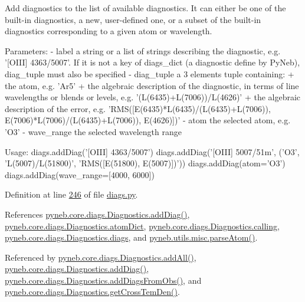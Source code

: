 \begin{DoxyVerb}Add diagnostics to the list of available diagnostics. It can either be one of the built-in diagnostics,
a new, user-defined one, or a subset of the built-in diagnostics corresponding to a given atom or wavelength.

Parameters:
    - label        a string or a list of strings describing the diagnostic, e.g. '[OIII] 4363/5007'. 
           If it is not a key of diags_dict (a diagnostic define by PyNeb), diag_tuple must also be specified
    - diag_tuple   a 3 elements tuple containing:
           + the atom, e.g. 'Ar5'
           + the algebraic description of the diagnostic, in terms of line wavelengths or blends or levels, 
             e.g. '(L(6435)+L(7006))/L(4626)'
           + the algebraic description of the error, e.g. 
             'RMS([E(6435)*L(6435)/(L(6435)+L(7006)), E(7006)*L(7006)/(L(6435)+L(7006)), E(4626)])'
    - atom         the selected atom, e.g. 'O3'
    - wave_range   the selected wavelength range
    
Usage:
diags.addDiag('[OIII] 4363/5007')
diags.addDiag('[OIII] 5007/51m', ('O3', 'L(5007)/L(51800)', 'RMS([E(51800), E(5007)])'))
diags.addDiag(atom='O3')
diags.addDiag(wave_range=[4000, 6000])\end{DoxyVerb}
 

Definition at line \hyperlink{diags_8py_source_l00246}{246} of file \hyperlink{diags_8py_source}{diags.\-py}.



References \hyperlink{diags_8py_source_l00246}{pyneb.\-core.\-diags.\-Diagnostics.\-add\-Diag()}, \hyperlink{diags_8py_source_l00407}{pyneb.\-core.\-diags.\-Diagnostics.\-atom\-Dict}, \hyperlink{diags_8py_source_l00169}{pyneb.\-core.\-diags.\-Diagnostics.\-calling}, \hyperlink{diags_8py_source_l00173}{pyneb.\-core.\-diags.\-Diagnostics.\-diags}, and \hyperlink{misc_8py_source_l00159}{pyneb.\-utils.\-misc.\-parse\-Atom()}.



Referenced by \hyperlink{diags_8py_source_l00327}{pyneb.\-core.\-diags.\-Diagnostics.\-add\-All()}, \hyperlink{diags_8py_source_l00246}{pyneb.\-core.\-diags.\-Diagnostics.\-add\-Diag()}, \hyperlink{diags_8py_source_l00353}{pyneb.\-core.\-diags.\-Diagnostics.\-add\-Diags\-From\-Obs()}, and \hyperlink{diags_8py_source_l00554}{pyneb.\-core.\-diags.\-Diagnostics.\-get\-Cross\-Tem\-Den()}.



